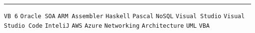 \documentclass[12pt]{developercv} %
\begin{document}

\vspace{\baselineskip}
\hrule
\vspace{\baselineskip}


\begin{minipage}[t]{0.7\textwidth}
	\vspace{-\baselineskip} %

	

	\texttt{VB 6}\slashsep
	\texttt{Oracle SOA}\slashsep
	\texttt{ARM Assembler}\slashsep
	\texttt{Haskell}\slashsep
	\texttt{Pascal}\slashsep
	\texttt{NoSQL}\slashsep
	\texttt{Visual Studio}\slashsep
	\texttt{Visual Studio Code}\slashsep
	\texttt{InteliJ}\slashsep
	\texttt{AWS}\slashsep
	\texttt{Azure}\slashsep
	\texttt{Networking}\slashsep
	\texttt{Architecture}\slashsep
	\texttt{UML}\slashsep
	\texttt{VBA}

\end{minipage}
\hfill
\begin{minipage}[t]{0.25\textwidth}
	\vspace{-\baselineskip} %
	\\
	\\
	
\end{minipage}



\pagebreak


\centering{}
\vspace{\baselineskip}
\end{document}

